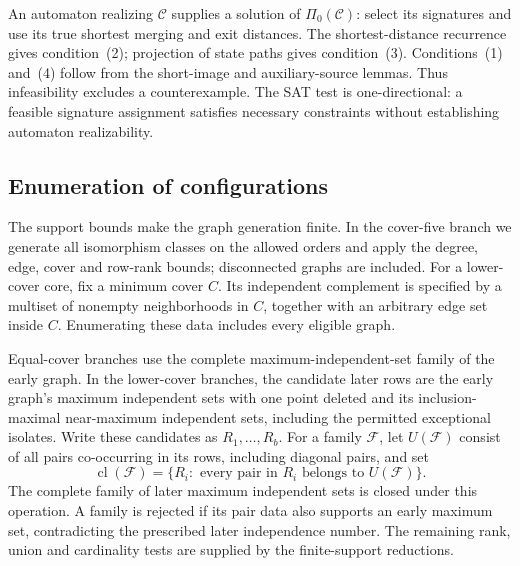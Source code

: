 \documentclass[11pt]{article}
\theoremstyle{definition}
\theoremstyle{plain}
\begin{document}
An automaton realizing $\mathcal C$ supplies a solution of
$\Pi_0(\mathcal C)$: select its signatures and use its true shortest
merging and exit distances. The shortest-distance recurrence gives
condition~(2); projection of state paths gives condition~(3).
Conditions~(1) and~(4) follow from the short-image and auxiliary-source
lemmas. Thus infeasibility excludes a counterexample. The SAT test is
one-directional: a feasible signature assignment satisfies necessary
constraints without establishing automaton realizability.

\subsection{Enumeration of configurations}
\label{sec:certificate-contract}
The support bounds make the graph generation finite. In the cover-five
branch we generate all isomorphism classes on the allowed orders and
apply the degree, edge, cover and row-rank bounds; disconnected graphs
are included. For a lower-cover core, fix a minimum cover $C$.
Its independent complement is specified by a multiset of nonempty
neighborhoods in $C$, together with an arbitrary edge set inside $C$.
Enumerating these data includes every eligible graph.

Equal-cover branches use the complete maximum-independent-set family
of the early graph. In the lower-cover branches, the candidate later
rows are the early graph's maximum
independent sets with one point deleted and its inclusion-maximal
near-maximum independent sets, including the permitted exceptional
isolates. Write these candidates as $R_1,\ldots,R_b$. For a family
$\mathcal F$, let $U(\mathcal F)$ consist of all pairs co-occurring in
its rows, including diagonal pairs, and set
\[
 \operatorname{cl}(\mathcal F)=
 \{R_i:\text{ every pair in }R_i\text{ belongs to }U(\mathcal F)\}.
\]
The complete family of later maximum independent sets is closed under
this operation. A family is rejected if its pair data also supports
an early maximum set, contradicting the prescribed later independence
number. The remaining rank, union and cardinality tests are supplied
by the finite-support reductions.
\end{document}
